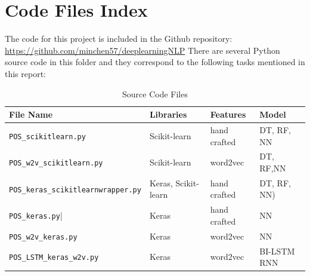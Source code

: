 \documentclass[11pt]{article}
\theoremstyle{plain}
\begin{document}
\pagebreak

\appendix
\section{Code Files Index}
The code for this project is included in the Github repository: 
\url{https://github.com/minchen57/deeplearningNLP}
There are several Python source code in this folder and they correspond to 
the following tasks mentioned in this report:

\begin{table}[!ht]
	\centering
	\caption{Source Code Files}\label{t:code}
	\begin{tabular}{llll}
		\hline \hline 
		File Name & Libraries & Features & Model \\
		\hline
		\verb|POS_scikitlearn.py| & Scikit-learn & hand crafted & DT, RF, NN \\
		\verb|POS_w2v_scikitlearn.py|& Scikit-learn & word2vec & DT, RF,NN\\
		\verb|POS_keras_scikitlearnwrapper.py|& Keras, Scikit-learn& 
		hand crafted & DT, RF, NN) \\
		\verb|POS_keras.py||& Keras& hand crafted & NN  \\
		\verb|POS_w2v_keras.py|& Keras& word2vec & NN\\
		\verb|POS_LSTM_keras_w2v.py|& Keras& word2vec & BI-LSTM RNN\\
		\hline \hline 
	\end{tabular}
\end{table}

\pagebreak


 
\end{document}
